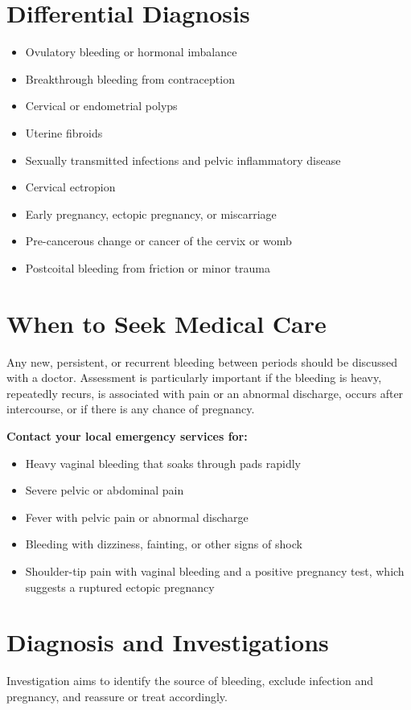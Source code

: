 \section*{Differential Diagnosis}
\begin{itemize}
    \item Ovulatory bleeding or hormonal imbalance
    \item Breakthrough bleeding from contraception
    \item Cervical or endometrial polyps
    \item Uterine fibroids
    \item Sexually transmitted infections and pelvic inflammatory disease
    \item Cervical ectropion
    \item Early pregnancy, ectopic pregnancy, or miscarriage
    \item Pre-cancerous change or cancer of the cervix or womb
    \item Postcoital bleeding from friction or minor trauma
\end{itemize}

\section*{When to Seek Medical Care}
Any new, persistent, or recurrent bleeding between periods should be discussed with a doctor. Assessment is particularly important if the bleeding is heavy, repeatedly recurs, is associated with pain or an abnormal discharge, occurs after intercourse, or if there is any chance of pregnancy.

\textbf{Contact your local emergency services for:}
\begin{itemize}
    \item Heavy vaginal bleeding that soaks through pads rapidly
    \item Severe pelvic or abdominal pain
    \item Fever with pelvic pain or abnormal discharge
    \item Bleeding with dizziness, fainting, or other signs of shock
    \item Shoulder-tip pain with vaginal bleeding and a positive pregnancy test, which suggests a ruptured ectopic pregnancy
\end{itemize}

\section*{Diagnosis and Investigations}
Investigation aims to identify the source of bleeding, exclude infection and pregnancy, and reassure or treat accordingly.

